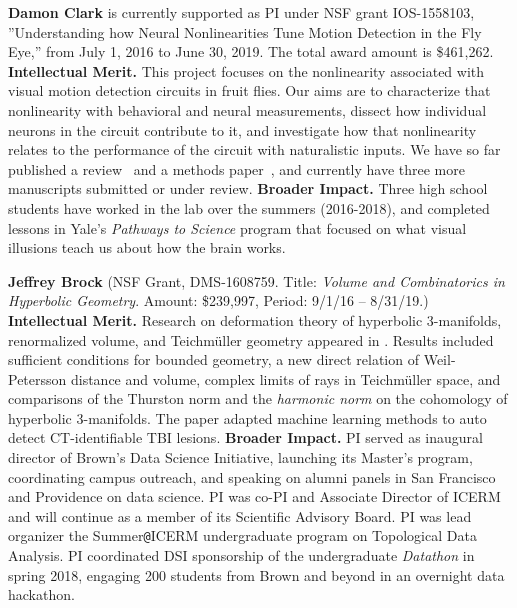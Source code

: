 \vskip10pt \textbf{Damon Clark} is currently supported as PI under NSF
grant IOS-1558103, ''Understanding how Neural Nonlinearities Tune
Motion Detection in the Fly Eye,'' from July 1, 2016 to June 30, 2019.
The total award amount is \$461,262.
{\bf Intellectual Merit.} This project focuses on the nonlinearity
associated with visual motion detection circuits in fruit flies. Our
aims are to characterize that nonlinearity with behavioral and neural
measurements, dissect how individual neurons in the circuit contribute
to it, and investigate how that nonlinearity relates to the
performance of the circuit with naturalistic inputs. We have so far
published a review~\citep{clark:16} and a methods
paper~\citep{mano:17}, and currently have three more manuscripts
submitted or under review.
{\bf Broader Impact.} Three high school students have worked in the lab
over the summers (2016-2018), and completed lessons in Yale's
\textit{Pathways to Science} program that focused on what visual
illusions teach us about how the brain works.

\vskip10pt \textbf{Jeffrey Brock} (NSF Grant, DMS-1608759. Title: {\em Volume and Combinatorics in Hyperbolic Geometry}. Amount: \$239,997, Period: 9/1/16 --
8/31/19.) 
\textbf{Intellectual Merit.} 
Research on deformation theory of hyperbolic 3-manifolds, renormalized volume, and Teichm\"uller geometry appeared in \citep{BMNS:bounded:models,Brock:Bromberg:vol,Brock:Bromberg:cone:inflex,BLMR:wp:limit,BLMR:teichmuller, Brock:Dunfield:norms}. Results included sufficient conditions for bounded geometry, a new direct relation of Weil-Petersson distance and volume, complex limits of rays in Teichm\"uller space, and comparisons of the Thurston norm and the {\em harmonic norm} on the cohomology of hyperbolic 3-manifolds. The paper \citep{Keshavamurthy:TBI} adapted machine learning methods to auto detect CT-identifiable TBI lesions.
\textbf{Broader Impact.} PI served as inaugural director of Brown's Data Science Initiative, launching its Master's program, coordinating campus outreach, and speaking on alumni panels in San Francisco and Providence on data science. PI was co-PI and Associate Director of ICERM and will continue as a member of its Scientific Advisory Board. PI was lead organizer the Summer\verb+@+ICERM undergraduate program on Topological Data Analysis.
PI coordinated DSI sponsorship of the undergraduate \textit{Datathon} in spring 2018, engaging 200 students from Brown and beyond in an overnight data hackathon. 
